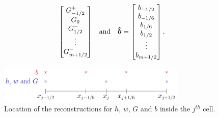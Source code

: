\begin{enumerate}[(i)]
\begin{align*}
\begin{bmatrix}
	G^+_{-1/2} \\ G_0 \\ G^-_{1/2}  \\ \vdots \\ G^-_{m+1/2}
	\end{bmatrix} & &\text{and}& & \boldsymbol{\hat{b}} = \begin{bmatrix}
	b_{-1/2} \\ b_{-1/6} \\ b_{1/6}  \\b_{1/2}  \\ \vdots \\ b_{m+1/2}
	\end{bmatrix}.
	\end{align*}
	
	\begin{figure}
		\centering
		\includegraphics[width=0.8\textwidth]{./chp3/figures/FEVMRecon.pdf}
		\caption{Location of the reconstructions for $h$, $w$, $G$ and $b$ inside the $j^{th}$ cell.}
		\label{fig:ReconLocs}
	\end{figure}
	

\end{enumerate}
